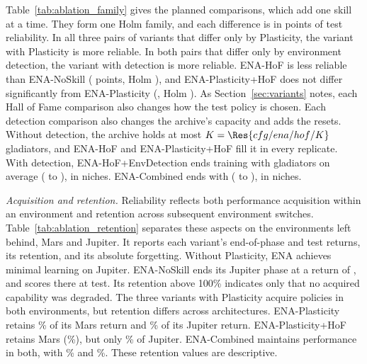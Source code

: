 Table~\ref{tab:ablation_family} gives the  planned comparisons, which add one skill at a time. They form one Holm family, and each difference is in points of test reliability. In all three pairs of variants that differ only by Plasticity, the variant with Plasticity is more reliable. In both pairs that differ only by environment detection, the variant with detection is more reliable. ENA-HoF is less reliable than ENA-NoSkill ( points, Holm ), and ENA-Plasticity+HoF does not differ significantly from ENA-Plasticity (, Holm ). As Section~\ref{sec:variants} notes, each Hall of Fame comparison also changes how the test policy is chosen. Each detection comparison also changes the archive's capacity and adds the resets. Without detection, the archive holds at most $K = \Res{cfg/ena/hof/K}$ gladiators, and ENA-HoF and ENA-Plasticity+HoF fill it in every replicate. With detection, ENA-HoF+EnvDetection ends training with  gladiators on average ( to ), in  niches. ENA-Combined ends with  ( to ), in  niches.

\textit{Acquisition and retention.} Reliability reflects both performance acquisition within an environment and retention across subsequent environment switches. Table~\ref{tab:ablation_retention} separates these aspects on the environments left behind, Mars and Jupiter. It reports each variant's end-of-phase and test returns, its retention, and its absolute forgetting. Without Plasticity, ENA achieves minimal learning on Jupiter. ENA-NoSkill ends its Jupiter phase at a return of , and scores  there at test. Its retention above 100\% indicates only that no acquired capability was degraded. The three variants with Plasticity acquire policies in both environments, but retention differs across architectures. ENA-Plasticity retains \% of its Mars return and \% of its Jupiter return. ENA-Plasticity+HoF retains Mars (\%), but only \% of Jupiter. ENA-Combined maintains performance in both, with \% and \%. These retention values are descriptive.

